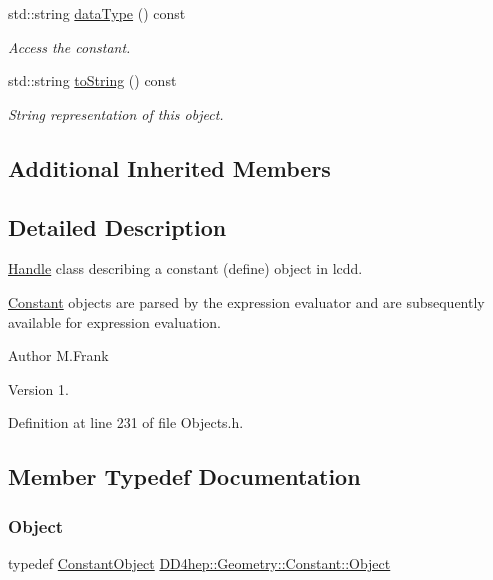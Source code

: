 \begin{DoxyCompactItemize}
std\+::string \hyperlink{class_d_d4hep_1_1_geometry_1_1_constant_a91d3889a9b3b330de6887c9f458b46e1}{data\+Type} () const
\begin{DoxyCompactList}\small\item\em Access the constant. \end{DoxyCompactList}\item 
std\+::string \hyperlink{class_d_d4hep_1_1_geometry_1_1_constant_a7eae0003864db52da7b9476d68c93aad}{to\+String} () const
\begin{DoxyCompactList}\small\item\em String representation of this object. \end{DoxyCompactList}\end{DoxyCompactItemize}
\subsection*{Additional Inherited Members}


\subsection{Detailed Description}
\hyperlink{class_d_d4hep_1_1_handle}{Handle} class describing a constant (define) object in lcdd. 

\hyperlink{class_d_d4hep_1_1_geometry_1_1_constant}{Constant} objects are parsed by the expression evaluator and are subsequently available for expression evaluation.

\begin{DoxyAuthor}{Author}
M.\+Frank 
\end{DoxyAuthor}
\begin{DoxyVersion}{Version}
1. 
\end{DoxyVersion}


Definition at line 231 of file Objects.\+h.



\subsection{Member Typedef Documentation}
\hypertarget{class_d_d4hep_1_1_geometry_1_1_constant_abff9d4c7bfbabd0f61a46253c4b79e70}{}\label{class_d_d4hep_1_1_geometry_1_1_constant_abff9d4c7bfbabd0f61a46253c4b79e70} 
\subsubsection{\texorpdfstring{Object}{Object}}
{\footnotesize\ttfamily typedef \hyperlink{class_d_d4hep_1_1_geometry_1_1_constant_object}{Constant\+Object} \hyperlink{class_d_d4hep_1_1_geometry_1_1_constant_abff9d4c7bfbabd0f61a46253c4b79e70}{D\+D4hep\+::\+Geometry\+::\+Constant\+::\+Object}}



